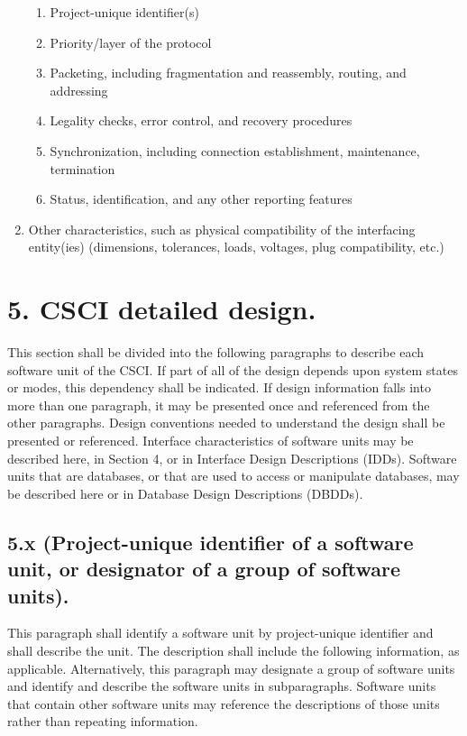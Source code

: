 \begin{enumerate}
  \begin{enumerate}
  \itemsep1pt\parskip0pt
  \item
    Project-unique identifier(s)
  \item
    Priority/layer of the protocol
  \item
    Packeting, including fragmentation and reassembly, routing, and
    addressing
  \item
    Legality checks, error control, and recovery procedures
  \item
    Synchronization, including connection establishment, maintenance,
    termination
  \item
    Status, identification, and any other reporting features
  \end{enumerate}
\item
  Other characteristics, such as physical compatibility of the
  interfacing entity(ies) (dimensions, tolerances, loads, voltages, plug
  compatibility, etc.)
\end{enumerate}

\section{5. CSCI detailed design.}

This section shall be divided into the following paragraphs to describe
each software unit of the CSCI. If part of all of the design depends
upon system states or modes, this dependency shall be indicated. If
design information falls into more than one paragraph, it may be
presented once and referenced from the other paragraphs. Design
conventions needed to understand the design shall be presented or
referenced. Interface characteristics of software units may be described
here, in Section 4, or in Interface Design Descriptions (IDDs). Software
units that are databases, or that are used to access or manipulate
databases, may be described here or in Database Design Descriptions
(DBDDs).

\subsection{5.x (Project-unique identifier of a software unit, or
designator of a group of software units).}

This paragraph shall identify a software unit by project-unique
identifier and shall describe the unit. The description shall include
the following information, as applicable. Alternatively, this paragraph
may designate a group of software units and identify and describe the
software units in subparagraphs. Software units that contain other
software units may reference the descriptions of those units rather than
repeating information.

